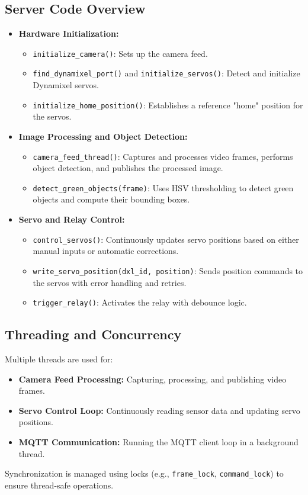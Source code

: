 \documentclass[12pt]{article}
\begin{document}
\subsection{Server Code Overview}
\begin{itemize}[leftmargin=*, label={--}]
    \item \textbf{Hardware Initialization:}
    \begin{itemize}[leftmargin=*, label={*}]
        \item \texttt{initialize\_camera()}: Sets up the camera feed.
        \item \texttt{find\_dynamixel\_port()} and \texttt{initialize\_servos()}: Detect and initialize Dynamixel servos.
        \item \texttt{initialize\_home\_position()}: Establishes a reference "home" position for the servos.
    \end{itemize}
    \item \textbf{Image Processing and Object Detection:}
    \begin{itemize}[leftmargin=*, label={*}]
        \item \texttt{camera\_feed\_thread()}: Captures and processes video frames, performs object detection, and publishes the processed image.
        \item \texttt{detect\_green\_objects(frame)}: Uses HSV thresholding to detect green objects and compute their bounding boxes.
    \end{itemize}
    \item \textbf{Servo and Relay Control:}
    \begin{itemize}[leftmargin=*, label={*}]
        \item \texttt{control\_servos()}: Continuously updates servo positions based on either manual inputs or automatic corrections.
        \item \texttt{write\_servo\_position(dxl\_id, position)}: Sends position commands to the servos with error handling and retries.
        \item \texttt{trigger\_relay()}: Activates the relay with debounce logic.
    \end{itemize}
\end{itemize}

\subsection{Threading and Concurrency}
Multiple threads are used for:
\begin{itemize}[leftmargin=*, label={--}]
    \item \textbf{Camera Feed Processing:} Capturing, processing, and publishing video frames.
    \item \textbf{Servo Control Loop:} Continuously reading sensor data and updating servo positions.
    \item \textbf{MQTT Communication:} Running the MQTT client loop in a background thread.
\end{itemize}
Synchronization is managed using locks (e.g., \texttt{frame\_lock}, \texttt{command\_lock}) to ensure thread-safe operations.
\end{document}
